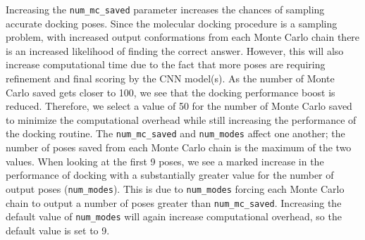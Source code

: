\documentclass[journal=jcisd8,manuscript=article]{achemso}
\begin{document}
Increasing the \texttt{num\_mc\_saved} parameter increases the chances of sampling accurate docking poses. Since the molecular docking procedure is a sampling problem, with increased output conformations from each Monte Carlo chain there is an increased likelihood of finding the correct answer. However, this will also increase computational time due to the fact that more poses are requiring refinement and final scoring by the CNN model(s). As the number of Monte Carlo saved gets closer to 100, we see that the docking performance boost is reduced. Therefore, we select a value of 50 for the number of Monte Carlo saved to minimize the computational overhead while still increasing the performance of the docking routine. The \texttt{num\_mc\_saved} and \texttt{num\_modes} affect one another; the number of poses saved from each Monte Carlo chain is the maximum of the two values. When looking at the first 9 poses, we see a marked increase in the performance of docking with a substantially greater value for the number of output poses (\texttt{num\_modes}). This is due to \texttt{num\_modes} forcing each Monte Carlo chain to output a number of poses greater than \texttt{num\_mc\_saved}. Increasing the default value of \texttt{num\_modes} will again increase computational overhead, so the default value is set to 9. 
\end{document}
